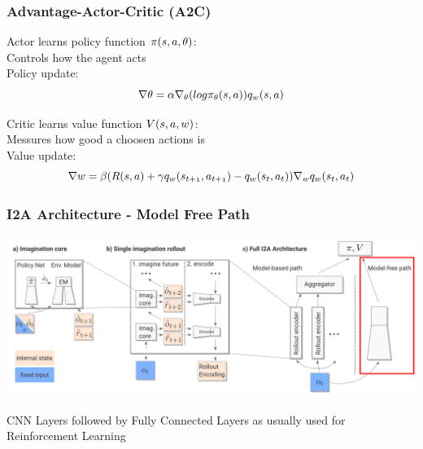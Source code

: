 \begin{frame}
    \frametitle{Advantage-Actor-Critic (A2C)}

\begin{PraesentationAufzaehlung}
    \item Actor	learns policy function $\mathnormal{\pi(s, a, \theta)}$:\\
	Controls how the agent acts\\
	Policy update:
	\begin{equation}
	\mathnormal{\nabla \theta = \alpha \nabla_\theta (log \pi_\theta (s, a)) q_w (s, a)}
	\end{equation}	
	\item Critic learns value function $\mathnormal{V(s, a, w)}$:\\
	Messures how good a choosen actions is\\
	Value update:
	\begin{equation}
	\mathnormal{
	\nabla w = \beta (R(s, a) + \gamma q_w(s_{t+1}, a_{t+1}) - q_w(s_t, a_t)) \nabla_w q_w(s_t, a_t)}
	\end{equation}
\end{PraesentationAufzaehlung}

\end{frame}
\clearpage


\begin{frame}
    \frametitle{I2A Architecture - Model Free Path}


\includegraphics[width=\columnwidth]{./Images/i2a_all_model_free_path.png}%

\begin{PraesentationAufzaehlung}
	\item CNN Layers followed by Fully Connected Layers as usually used for Reinforcement Learning
\end{PraesentationAufzaehlung}

\end{frame}
\clearpage

